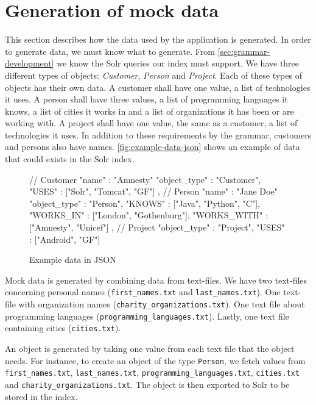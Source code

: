 \section{Generation of mock data}
This section describes how the data used by the application is generated. In order to generate data, we must know what to generate. From \autoref{sec:grammar-development} we know the Solr queries our index must support. We have three different types of objects: \emph{Customer}, \emph{Person} and \emph{Project}. Each of these types of objects has their own data. A customer shall have one value, a list of technologies it uses. A person shall have three values, a list of programming languages it knows, a list of cities it works in and a list of organizations it has been or are working with. A project shall have one value, the same as a customer, a list of technologies it uses. In addition to these requirements by the grammar, customers and persons also have names. \autoref{fig:example-data-json} shows an example of data that could exists in the Solr index.

\begin{figure}[H]
\begin{js-code}
{ // Customer
  "name" : "Amnesty"
  "object_type" : "Customer",
  "USES" : ["Solr", "Tomcat", "GF"]
},
{ // Person
  "name" : "Jane Doe"
  "object_type" : "Person",
  "KNOWS" : ["Java", "Python", "C"],
  "WORKS_IN" : ["London", "Gothenburg"],
  "WORKS_WITH" :  ["Amnesty", "Unicef"]
},
{ // Project
  "object_type" : "Project",
  "USES" : ["Android", "GF"]
}
\end{js-code}
\caption{Example data in JSON\label{fig:example-data-json}}
\end{figure}

Mock data is generated by combining data from text-files. We have two text-files concerning personal names (\texttt{first\_names.txt} and \texttt{last\_names.txt}). One text-file with organization names (\texttt{charity\_organizations.txt}). One text file about programming languages (\texttt{programming\_languages.txt}). Lastly, one text file containing cities (\texttt{cities.txt}). 

An object is generated by taking one value from each text file that the object needs. For instance, to create an object of the type \texttt{Person}, we fetch values from \texttt{first\_names.txt}, \texttt{last\_names.txt}, \texttt{programming\_languages.txt}, \texttt{cities.txt} and \texttt{charity\_organizations.txt}. The object is then exported to Solr to be stored in the index.